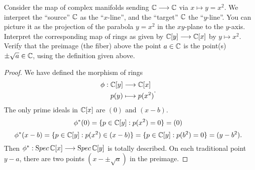 \documentclass[11pt,fleqn]{book}
\begin{document}
\begin{exr}
Consider the map of complex manifolds sending $\mathbb C\longrightarrow \mathbb C$ via $x\mapsto y=x^2$. We interpret the “source” $\mathbb C$ as the “$x$-line”, and the “target” $\mathbb C$ the “$y$-line”. You can picture it as the projection of the parabola $y=x^2$ in the $xy$-plane to the $y$-axis. Interpret the corresponding map of rings as given by ${\mathbb C[y] \longrightarrow \mathbb C[x]}$ by  $y\mapsto x^2$. Verify that the preimage (the fiber) above the point $a\in\mathbb C$ is the point(s) $\pm\sqrt a\in\mathbb C$, using the definition given above.
\end{exr}
\begin{proof}
We have defined the morphism of rings
$$
\begin{aligned}
\phi:\mathbb C[y]&\longrightarrow\mathbb C[x]\\
 p(y)&\longmapsto p(x^2)
\end{aligned}.
$$
The only prime ideals in $\mathbb C[x]$ are $(0)$ and $(x-b)$. 
$$
\phi^*(0)=\{p\in \mathbb C[y]: p(x^2)=0\}=(0)
$$
$$
\phi^*(x-b)=\{p\in\mathbb C[y]: p(x^2)\in (x-b)\}=\{p\in\mathbb C[y]: p(b^2)=0\}=(y-b^2).
$$
Then $\phi^*: {\text Spec\,}\mathbb C[x]\longrightarrow{\text Spec\,} \mathbb C[y]$  is totally described. On each traditional point $y-a$, there are two points $(x-\pm \sqrt a)$ in the preimage.
\end{proof}
\end{document}
